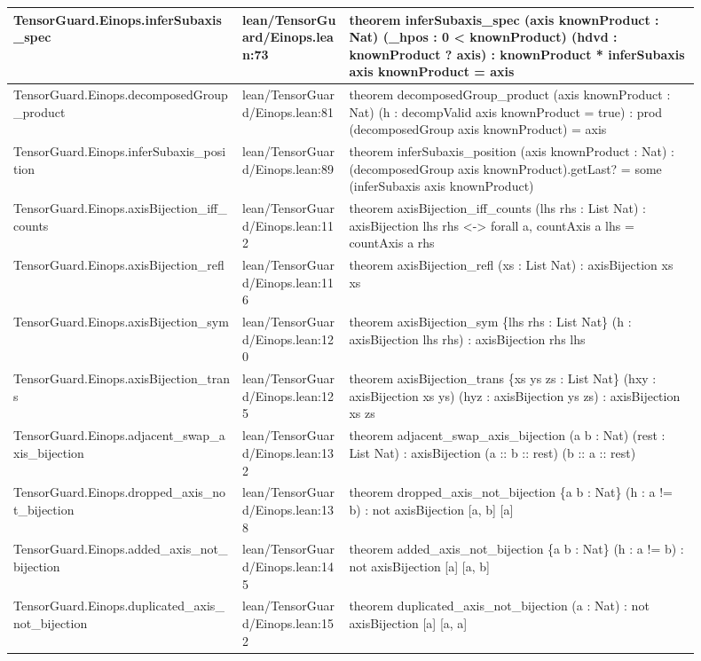 \documentclass[10pt]{article}
\begin{document}
\begin{longtable}{|p{0.30\linewidth}|p{0.14\linewidth}|p{0.46\linewidth}|}
\hline
TensorGuard.Einops.inferSubaxis\_spec & lean/TensorGuard/Einops.lean:73 & theorem inferSubaxis\_spec (axis knownProduct : Nat) (\_hpos : 0 < knownProduct) (hdvd : knownProduct ? axis) : knownProduct * inferSubaxis axis knownProduct = axis \\
\hline
TensorGuard.Einops.decomposedGroup\_product & lean/TensorGuard/Einops.lean:81 & theorem decomposedGroup\_product (axis knownProduct : Nat) (h : decompValid axis knownProduct = true) : prod (decomposedGroup axis knownProduct) = axis \\
\hline
TensorGuard.Einops.inferSubaxis\_position & lean/TensorGuard/Einops.lean:89 & theorem inferSubaxis\_position (axis knownProduct : Nat) : (decomposedGroup axis knownProduct).getLast? = some (inferSubaxis axis knownProduct) \\
\hline
TensorGuard.Einops.axisBijection\_iff\_counts & lean/TensorGuard/Einops.lean:112 & theorem axisBijection\_iff\_counts (lhs rhs : List Nat) : axisBijection lhs rhs <-> forall a, countAxis a lhs = countAxis a rhs \\
\hline
TensorGuard.Einops.axisBijection\_refl & lean/TensorGuard/Einops.lean:116 & theorem axisBijection\_refl (xs : List Nat) : axisBijection xs xs \\
\hline
TensorGuard.Einops.axisBijection\_sym & lean/TensorGuard/Einops.lean:120 & theorem axisBijection\_sym \{lhs rhs : List Nat\} (h : axisBijection lhs rhs) : axisBijection rhs lhs \\
\hline
TensorGuard.Einops.axisBijection\_trans & lean/TensorGuard/Einops.lean:125 & theorem axisBijection\_trans \{xs ys zs : List Nat\} (hxy : axisBijection xs ys) (hyz : axisBijection ys zs) : axisBijection xs zs \\
\hline
TensorGuard.Einops.adjacent\_swap\_axis\_bijection & lean/TensorGuard/Einops.lean:132 & theorem adjacent\_swap\_axis\_bijection (a b : Nat) (rest : List Nat) : axisBijection (a :: b :: rest) (b :: a :: rest) \\
\hline
TensorGuard.Einops.dropped\_axis\_not\_bijection & lean/TensorGuard/Einops.lean:138 & theorem dropped\_axis\_not\_bijection \{a b : Nat\} (h : a != b) : not  axisBijection [a, b] [a] \\
\hline
TensorGuard.Einops.added\_axis\_not\_bijection & lean/TensorGuard/Einops.lean:145 & theorem added\_axis\_not\_bijection \{a b : Nat\} (h : a != b) : not  axisBijection [a] [a, b] \\
\hline
TensorGuard.Einops.duplicated\_axis\_not\_bijection & lean/TensorGuard/Einops.lean:152 & theorem duplicated\_axis\_not\_bijection (a : Nat) : not  axisBijection [a] [a, a] \\

\end{longtable}
\end{document}

